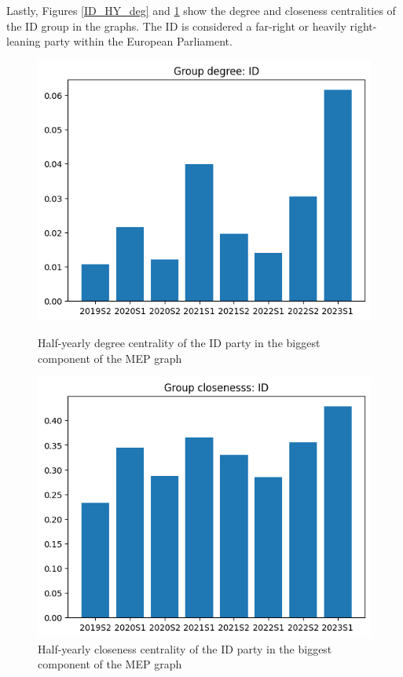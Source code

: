 \documentclass[lettersize,journal]{IEEEtran}
\begin{document}
Lastly, Figures \ref{ID_HY_deg} and \ref{ID_HY_cls} show the degree and closeness centralities of the ID group in the graphs. The ID is considered a far-right or heavily right-leaning party within the European Parliament.

\begin{figure}[h]
  \centering
  \begin{minipage}[b]{0.23\textwidth}
    \includegraphics[width=\textwidth]{ID_HY_deg.png}
    \caption{Half-yearly degree centrality of the ID party in the biggest component of the MEP graph}
    \label{ID_HY_deg}
  \end{minipage}
  \hfill
  \begin{minipage}[b]{0.23\textwidth}
    \includegraphics[width=\textwidth]{ID_HY_cls.png}
    \caption{Half-yearly closeness centrality of the ID party in the  biggest component of the MEP graph}
    \label{ID_HY_cls}
  \end{minipage}
\end{figure}
\end{document}
